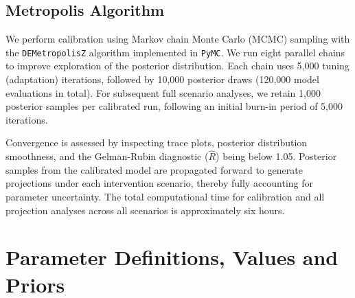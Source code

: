 \documentclass[11pt]{article}
\begin{document}
\subsection{Metropolis Algorithm}
We perform calibration using Markov chain Monte Carlo (MCMC) sampling with the \texttt{DEMetropolisZ} algorithm implemented in \texttt{PyMC}. We run eight parallel chains to improve exploration of the posterior distribution. Each chain uses 5,000 tuning (adaptation) iterations, followed by 10,000 posterior draws (120,000 model evaluations in total). For subsequent full scenario analyses, we retain 1,000 posterior samples per calibrated run, following an initial burn-in period of 5,000 iterations. 

Convergence is assessed by inspecting trace plots, posterior distribution smoothness, and the Gelman-Rubin diagnostic (\(\hat{R}\)) being below 1.05. Posterior samples from the calibrated model are propagated forward to generate projections under each intervention scenario, thereby fully accounting for parameter uncertainty. The total computational time for calibration and all projection analyses across all scenarios is approximately six hours.

\section{Parameter Definitions, Values and Priors}




\small

\end{document}
